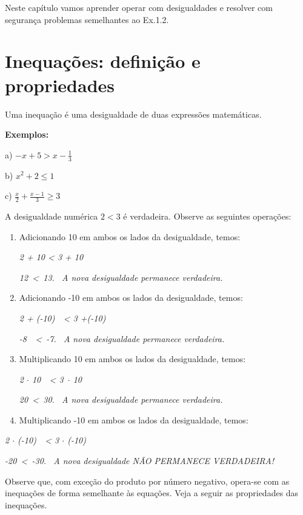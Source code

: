 Neste capítulo vamos aprender operar com desigualdades e resolver com segurança problemas semelhantes ao Ex.1.2.

\section{Inequações: definição e propriedades}

\begin{tdefinicao}
    Uma inequação é uma desigualdade de duas expressões matemáticas.
\end{tdefinicao}

\textbf{Exemplos:}

a) $-x +5 > x -\frac{1}{3}$

b) $x^{2} +2\leq 1$

c)  \( \frac{x}{2}+\frac{x-1}{3} \geq 3 \) \qedsymbol{}

A desigualdade numérica $2 < 3$ é verdadeira. Observe as seguintes operações:

\begin{enumerate}
	\item Adicionando 10 em ambos os lados da desigualdade, temos: 

\textit{2 + 10 <  3 + 10}

\textit{12~<~13.~   A nova desigualdade permanece verdadeira.}

	\item Adicionando -10 em ambos os lados da desigualdade, temos: 

\textit{2 + (-10)~~<  3 +(-10)}

\textit{-8~~<~-7.~   A nova desigualdade permanece verdadeira.~ }

	\item Multiplicando 10 em ambos os lados da desigualdade, temos: 

 \textit{2 $ \cdot $  10~~<  3~$ \cdot $   10}

\textit{20~<~30.~   A nova desigualdade permanece verdadeira.~ }

	\item Multiplicando -10 em ambos os lados da desigualdade, temos: 
\end{enumerate}

\textit{2 $ \cdot $  (-10)~~<  3 $ \cdot $  (-10)}

\textit{-20~<~-30.~   A nova desigualdade NÃO PERMANECE VERDADEIRA! }

Observe que, com exceção do produto por número negativo, opera-se com as inequações de forma semelhante às equações. Veja a seguir as propriedades das inequações.

